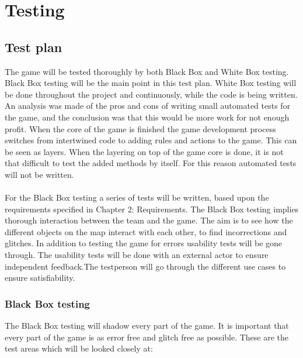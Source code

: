\section{Testing}
\subsection{Test plan}
The game will be tested thoroughly by both Black Box and White Box testing. Black Box testing will be the main point in this test plan. White Box testing will be done throughout the project and continuously, while the code is being written. An analysis was made of the pros and cons of writing small automated tests for the game, and the conclusion was that this would be more work for not enough profit. When the core of the game is finished the game development process switches from intertwined code to adding rules and actions to the game. This can be seen as layers. When the layering on top of the game core is done, it is not that difficult to test the added methods by itself. For this reason automated tests will not be written.\\
\\
For the Black Box testing a series of tests will be written, based upon the requirements specified in Chapter 2: Requirements. The Black Box testing implies thorough interaction between the team and the game. The aim is to see how the different objects on the map interact with each other, to find incorrections and glitches. In addition to testing the game for errors usability tests will be gone through. The usability tests will be done with an external actor to ensure independent feedback.The testperson will go through the different use cases to ensure satisfiability. \\

\subsubsection{Black Box testing}

The Black Box testing will shadow every part of the game. It is important that every part of the game is as error free and glitch free as possible. These are the test areas which will be looked closely at:


